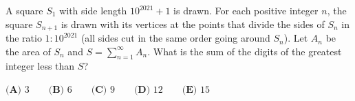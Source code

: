 A square $S_1$ with side length $10^{2021}+1$ is drawn. For each positive integer $n$, the square $S_{n+1}$ is drawn with its vertices at the points that divide the sides of $S_n$ in the ratio $1:10^{2021}$ (all sides cut in the same order going around $S_n$). Let $A_n$ be the area of $S_n$ and $S=\sum_{n=1}^{\infty}A_n$. What is the sum of the digits of the greatest integer less than $S$?

$\textbf{(A) } 3 \qquad \textbf{(B) } 6 \qquad \textbf{(C) } 9 \qquad \textbf{(D) } 12 \qquad \textbf{(E) } 15$
